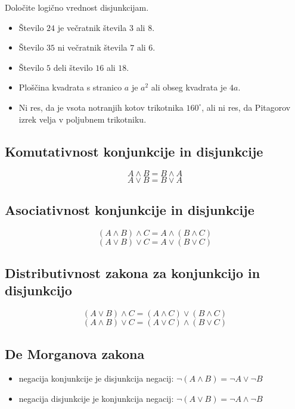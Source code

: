          

         
             \begin{naloga}
                Določite logično vrednost disjunkcijam.
                \begin{itemize}
                    \item Število $24$ je večratnik števila $3$ ali $8$.
                    \item Število $35$ ni večratnik števila $7$ ali $6$.
                    \item Število $5$ deli število $16$ ali $18$.
                    \item Ploščina kvadrata s stranico $a$ je $a^2$ ali obseg kvadrata je $4a$.
                    \item Ni res, da je vsota notranjih kotov trikotnika $160^\circ$, ali ni res, 
                        da Pitagorov izrek velja v poljubnem trikotniku.
                \end{itemize}
            \end{naloga}
         


         
             \subsection{Komutativnost konjunkcije in disjunkcije}
                $$ A\land B = B\land A $$
                $$ A\lor B = B\lor A$$
                   
            
             \subsection{Asociativnost konjunkcije in disjunkcije}
                $$(A\land B)\land C = A\land(B\land C) $$
                $$ (A\lor B)\lor C = A\lor (B\lor C) $$
             

             \subsection{Distributivnost zakona za konjunkcijo in disjunkcijo}
                $$(A\lor B)\land C = (A\land C)\lor(B\land C) $$
                $$ (A\land B)\lor C = (A\lor C)\land(B\lor C) $$
             

             \subsection{De Morganova zakona}
                \begin{itemize}
                    \item negacija konjunkcije je disjunkcija negacij: 
                        $\lnot(A\land B)=\lnot A\lor\lnot B$
                    \item negacija disjunkcije je konjunkcija negacij: 
                        $\lnot(A\lor B)=\lnot A\land\lnot B$
                \end{itemize}                
             
